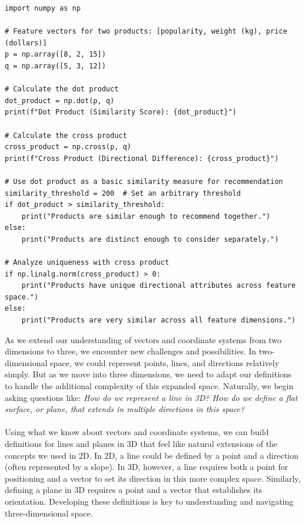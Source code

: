 \begin{lstlisting}
import numpy as np

# Feature vectors for two products: [popularity, weight (kg), price (dollars)]
p = np.array([8, 2, 15])
q = np.array([5, 3, 12])

# Calculate the dot product
dot_product = np.dot(p, q)
print(f"Dot Product (Similarity Score): {dot_product}")

# Calculate the cross product
cross_product = np.cross(p, q)
print(f"Cross Product (Directional Difference): {cross_product}")

# Use dot product as a basic similarity measure for recommendation
similarity_threshold = 200  # Set an arbitrary threshold
if dot_product > similarity_threshold:
    print("Products are similar enough to recommend together.")
else:
    print("Products are distinct enough to consider separately.")

# Analyze uniqueness with cross product
if np.linalg.norm(cross_product) > 0:
    print("Products have unique directional attributes across feature space.")
else:
    print("Products are very similar across all feature dimensions.")
\end{lstlisting}


\newpage









  


\noindent As we extend our understanding of vectors and coordinate systems from two dimensions to three, we encounter new challenges and possibilities. In two-dimensional space, we could represent points, lines, and directions relatively simply. But as we move into three dimensions, we need to adapt our definitions to handle the additional complexity of this expanded space. Naturally, we begin asking questions like: \textit{How do we represent a line in 3D? How do we define a flat surface, or plane, that extends in multiple directions in this space?} \\ \\ Using what we know about vectors and coordinate systems, we can build definitions for lines and planes in 3D that feel like natural extensions of the concepts we used in 2D. In 2D, a line could be defined by a point and a direction (often represented by a slope). In 3D, however, a line requires both a point for positioning and a vector to set its direction in this more complex space. Similarly, defining a plane in 3D requires a point and a vector that establishes its orientation. Developing these definitions is key to understanding and navigating three-dimensional space.

